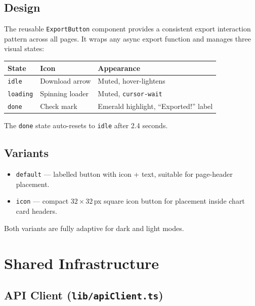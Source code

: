 \documentclass[12pt,a4paper]{report}
\begin{document}
\section{Design}

The reusable \texttt{ExportButton} component provides a consistent export
interaction pattern across all pages. It wraps any async export function and
manages three visual states:

\begin{center}
\begin{tabular}{lll}
  \toprule
  \textbf{State} & \textbf{Icon} & \textbf{Appearance} \\
  \midrule
  \texttt{idle}    & Download arrow  & Muted, hover-lightens \\
  \texttt{loading} & Spinning loader & Muted, \texttt{cursor-wait} \\
  \texttt{done}    & Check mark      & Emerald highlight, ``Exported!'' label \\
  \bottomrule
\end{tabular}
\end{center}

The \texttt{done} state auto-resets to \texttt{idle} after 2.4 seconds.

\section{Variants}

\begin{itemize}[leftmargin=2em]
  \item \texttt{default} — labelled button with icon + text, suitable for
        page-header placement.
  \item \texttt{icon} — compact $32 \times 32$\,px square icon button for
        placement inside chart card headers.
\end{itemize}

Both variants are fully adaptive for dark and light modes.

\chapter{Shared Infrastructure}

\section{API Client (\texttt{lib/apiClient.ts})}
\end{document}

